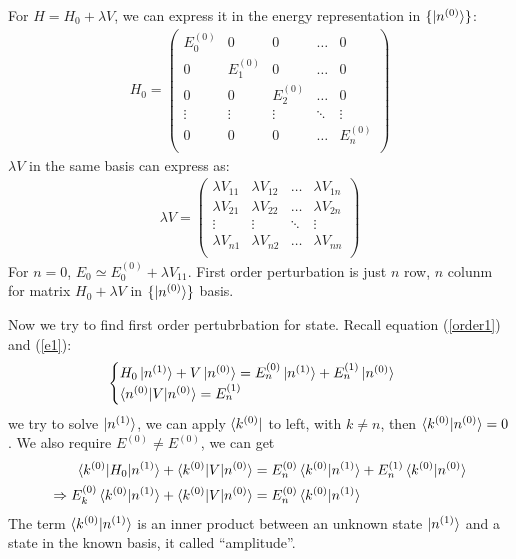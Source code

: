 \documentclass[UTF8,12pt]{article} %
\begin{document}
For $H=H_0+\lambda V$, we can express it in the energy representation in $\{\ket{n^{(0)}}\}$:
\begin{align}
H_0 = 
\begin{pmatrix}
     E^{(0)}_0& 0         & 0         & \ldots    & 0         \\
     0        & E^{(0)}_1 & 0         & \ldots    & 0         \\
     0        & 0         & E^{(0)}_2 & \ldots    & 0         \\
     \vdots   & \vdots    & \vdots    & \ddots    & \vdots    \\
     0        & 0         & 0         & \ldots    & E^{(0)}_n \\
\end{pmatrix}
\end{align}
$\lambda V$ in the same basis can express as:
\begin{align}
\lambda V = 
\begin{pmatrix}
    \lambda V_{11} & \lambda V_{12} & \ldots & \lambda V_{1n} \\
    \lambda V_{21} & \lambda V_{22} & \ldots & \lambda V_{2n} \\
    \vdots         & \vdots         & \ddots & \vdots         \\
    \lambda V_{n1} & \lambda V_{n2} & \ldots & \lambda V_{nn} \\
\end{pmatrix}
\end{align}
For $n=0$, $E_0\simeq E^{(0)}_0+\lambda V_{11}$. First order perturbation is just $n$ row, $n$ colunm for matrix $H_0+\lambda V$ in $\{\ket{n^{(0)}}\}$ basis.

Now we try to find first order pertubrbation for state. Recall equation (\ref{order1}) and (\ref{e1}):
\begin{align*}
\begin{cases}
H_0\ket{n^{(1)}}+V\ket{n^{(0)}} = E^{(0)}_n\ket{n^{(1)}}+E^{(1)}_n\ket{n^{(0)}} \\
\braket{n^{(0)}|V|n^{(0)}} = E^{(1)}_n
\end{cases}
\end{align*}
we try to solve $\ket{n^{(1)}}$, we can apply $\bra{k^{(0)}}$ to left, with $k\neq n$, then $\braket{k^{(0)}|n^{(0)}}=0$. We also require $E^{(0)} \neq E^{(0)}$, we can get 
\begin{align}
\braket{k^{(0)}|H_0|n^{(1)}}+\braket{k^{(0)}|V|n^{(0)}} &= E^{(0)}_n\braket{k^{(0)}|n^{(1)}}+E^{(1)}_n\braket{k^{(0)}|n^{(0)}} \\
\Rightarrow E^{(0)}_k\braket{ k^{(0)} | n^{(1)} }+\braket{k^{(0)}|V|n^{(0)}} &= E^{(0)}_n\braket{k^{(0)} | n^{(1)}} \label{ek}
\end{align}
The term $\braket{k^{(0)} | n^{(1)}}$ is an inner product between an unknown state $\ket{n^{(1)}}$ and a state in the known basis, it called ``amplitude''.
\end{document}
